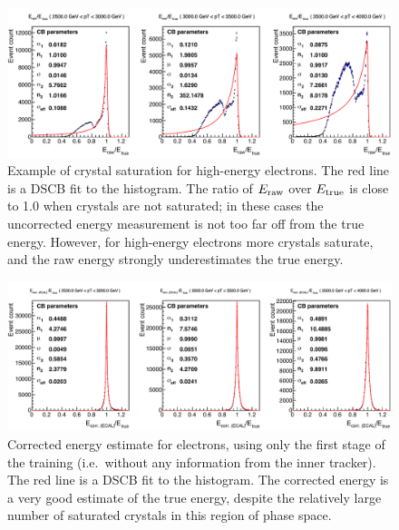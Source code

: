 \begin{figure}[hbtp]
  \begin{center}
    \includegraphics[width=0.99\linewidth]{img/regression/saturation.pdf}
    \caption{
        Example of crystal saturation for high-energy electrons.
        The red line is a DSCB fit to the histogram.
        The ratio of $E_\text{raw}$ over $E_\text{true}$ is close to 1.0 when crystals are not saturated; in these cases the uncorrected energy measurement is not too far off from the true energy.
        However, for high-energy electrons more crystals saturate, and the raw energy strongly underestimates the true energy.
        }
    \label{fig:saturation}
  \end{center}
\end{figure}

\begin{figure}[hbtp]
  \begin{center}
    \includegraphics[width=0.99\linewidth]{img/regression/saturation_corrected.pdf}
    \caption{
        Corrected energy estimate for electrons, using only the first stage of the training (i.e.\ without any information from the inner tracker).
        The red line is a DSCB fit to the histogram.
        The corrected energy is a very good estimate of the true energy, despite the relatively large number of saturated crystals in this region of phase space.
        }
    \label{fig:saturation_corrected}
  \end{center}
\end{figure}


